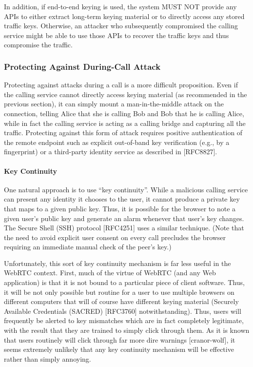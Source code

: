 \documentclass{article}
\begin{document}
In addition, if end-to-end keying is used, the system MUST NOT
provide any APIs to either extract long-term keying material or to
directly access any stored traffic keys.  Otherwise, an attacker who
subsequently compromised the calling service might be able to use
those APIs to recover the traffic keys and thus compromise the
traffic.

\subsubsection{Protecting Against During-Call Attack}

Protecting against attacks during a call is a more difficult
proposition.  Even if the calling service cannot directly access
keying material (as recommended in the previous section), it can
simply mount a man-in-the-middle attack on the connection, telling
Alice that she is calling Bob and Bob that he is calling Alice, while
in fact the calling service is acting as a calling bridge and
capturing all the traffic.  Protecting against this form of attack
requires positive authentication of the remote endpoint such as
explicit out-of-band key verification (e.g., by a fingerprint) or a
third-party identity service as described in [RFC8827].

\paragraph{Key Continuity}

One natural approach is to use ``key continuity''.  While a malicious
calling service can present any identity it chooses to the user, it
cannot produce a private key that maps to a given public key.  Thus,
it is possible for the browser to note a given user's public key and
generate an alarm whenever that user's key changes.  The Secure Shell
(SSH) protocol [RFC4251] uses a similar technique.  (Note that the
need to avoid explicit user consent on every call precludes the
browser requiring an immediate manual check of the peer's key.)

Unfortunately, this sort of key continuity mechanism is far less
useful in the WebRTC context.  First, much of the virtue of WebRTC
(and any Web application) is that it is not bound to a particular
piece of client software.  Thus, it will be not only possible but
routine for a user to use multiple browsers on different computers
that will of course have different keying material (Securely
Available Credentials (SACRED) [RFC3760] notwithstanding).  Thus,
users will frequently be alerted to key mismatches which are in fact
completely legitimate, with the result that they are trained to
simply click through them.  As it is known that users routinely will
click through far more dire warnings [cranor-wolf], it seems
extremely unlikely that any key continuity mechanism will be
effective rather than simply annoying.
\end{document}
